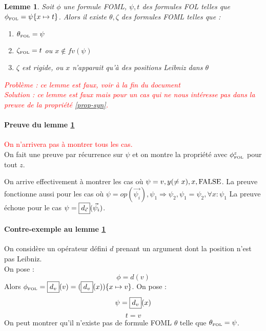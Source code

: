 \documentclass[12pt]{article}
\newcommand{\FOL}{\ensuremath{\textup{\tiny{}FOL}}}
\newcommand{\raph}[1]{\textcolor{red}{#1}}
\newtheorem{lem}{Lemme}
\begin{document}
\begin{lem}
  \label{lemme-theta}
  Soit $\phi$ une formule FOML, $\psi, t$ des formules FOL telles que $\phi_\FOL = \psi\{x \mapsto t\}$.
  Alors il existe $\theta, \zeta$ des formules FOML telles que :
  \begin{enumerate}
  \item
    $\theta_\FOL = \psi$
  \item
    $\zeta_\FOL = t$ ou $x \notin fv(\psi)$
  \item
    $\zeta$ est rigide, ou $x$ n'apparait qu'à des positions Leibniz dans $\theta$
  \end{enumerate}
  \raph{Problème : ce lemme est faux, voir à la fin du document}\\
  \raph{Solution : ce lemme est faux mais pour un cas qui ne nous intéresse pas dans la preuve de la propriété \ref{prop-syn}.}
\end{lem}

\paragraph{Preuve du lemme \ref{lemme-theta}}

\raph{On n'arrivera pas à montrer tous les cas.}\\
On fait une preuve par récurrence sur $\psi$ et on montre la propriété avec $\phi_\FOL^z$ pour tout $z$.

On arrive effectivement à montrer les cas où $\psi = v, y (\neq x), x, \textup{FALSE}$.
La preuve fonctionne aussi pour les cas où $\psi = op(\vec{\psi_i}), \psi_1 \Rightarrow \psi_2, \psi_1 = \psi_2, \forall x : \psi_1$
La preuve échoue pour le cas \(\psi = \framebox{$d_{\vec{\epsilon}}$}(\vec{\psi_i}) \).

\paragraph{Contre-exemple au lemme \ref{lemme-theta}}

On considère un opérateur défini $d$ prenant un argument dont la position n'est pas Leibniz. \\
On pose :
\[ \phi = d(v) \]
Alors \(\phi_\FOL = \framebox{$d_v$}(v) = (\framebox{$d_v$}(x))\{x \mapsto v\} \).
On pose :
\[ \psi = \framebox{$d_v$}(x) \]
\[ t = v \]
On peut montrer qu'il n'existe pas de formule FOML $\theta$ telle que $\theta_\FOL = \psi$.

\vspace{1cm}
\end{document}
